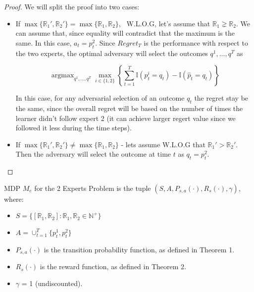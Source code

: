 \documentclass[a4paper, 12pt]{article}
\DeclareMathOperator*{\argmax}{argmax}
\begin{document}
\begin{proof}
    We will split the proof into two cases:
    \begin{itemize}
        \item If $\max\{ \mathbb{R}_1' ,  \mathbb{R}_2' \} = \max\{ \mathbb{R}_1 ,  \mathbb{R}_2 \}$, \ 
        W.L.O.G, let's assume that $\mathbb{R}_1 \gneq \mathbb{R}_2$.
        We can assume that, since equality will contradict that the maximum is the same.
        In this case, $a_t = p_t^2$. Since $Regret_T$ is the performance with respect to the two experts, 
        the optimal adversary will select the outcomes $q^1, \dots, q^T$ as

        \[ \argmax_{q^1, \dots , q^T} \max_{i \in \{1,2\}}  \left\{ \sum_{t=1}^T \mathbb{I}(p_t^i = q_t) - \mathbb{I}(\hat{p}_t = q_t) \right\} \]
        
        In this case, for any adversarial selection of an outcome $q_t$ the regret stay be the same, 
        since the overall regret will be based on the number of times the learner didn't follow expert 2 
        (it can achieve larger regert value since we followed it less during the time steps).

        

        \item If $\max\{ \mathbb{R}_1' ,  \mathbb{R}_2' \} \neq \max\{ \mathbb{R}_1 ,  \mathbb{R}_2 \}$ - 
        lets assume W.L.O.G that $\mathbb{R}_1' > \mathbb{R}_2'$.
        Then the adversary will select the outcome at time $t$ as $q_t = p_t^2$.
    \end{itemize}

\end{proof}


\bigskip

MDP $M_e$ for the 2 Experts Problem is the tuple $(S, A, P_{s,a}(\cdot) , R_s(\cdot), \gamma)$, where:
\begin{itemize}
    \item $S = \{ [ \mathbb{R}_1 ,  \mathbb{R}_2 ] : \mathbb{R}_1, \mathbb{R}_2 \in \mathbb{N}^+ \}$ 
    \item $A =  \cup_{t=1}^T \{p_t^1, p_t^2\}$ 
    \item $P_{s,a}(\cdot)$ is the transition probability function, as defined in Theorem 1.
    \item $R_s(\cdot)$ is the reward function, as defined in Theorem 2.
    \item $\gamma$ = 1 (undiscounted).
\end{itemize}
\end{document}

